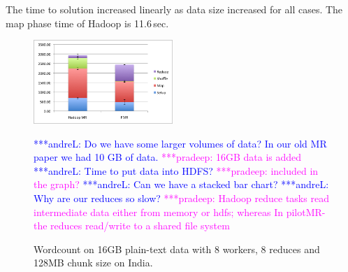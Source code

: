 \documentclass{acm_proc_article-sp}
\newcommand{\alnote}[1]{ {\textcolor{blue} { ***andreL: #1 }}}
\newcommand{\pnote}[1]{ {\textcolor{magenta} { ***pradeep: #1 }}}
\newcommand{\alnote}[1]{}
\newcommand{\pnote}[1]{}
\begin{document}
The time to solution increased linearly as data size increased for all cases. 
The map phase time of Hadoop is 11.6\,sec.



\begin{figure}[compMR_16GB]
	\centering
		\includegraphics[width=0.47\textwidth]{figures/comparision_16gb.png}
	\caption{Wordcount on 16GB plain-text data with 8 workers, 8 reduces and 128MB chunk size on India.}
	\alnote{Do we have some larger volumes of data? In our old MR paper we
	had 10 GB of data.} \pnote{16GB data is added}
	\alnote{Time to put data into HDFS?} \pnote{ included in the graph?}
	\alnote{Can we have a stacked bar chart?}
	\alnote{Why are our reduces so slow?} \pnote{ Hadoop reduce tasks read intermediate data either from memory or hdfs; whereas In pilotMR- the reduces read/write  to a shared file system}
	\label{fig:figures_compMR_16GB}
\end{figure}
\end{document}
